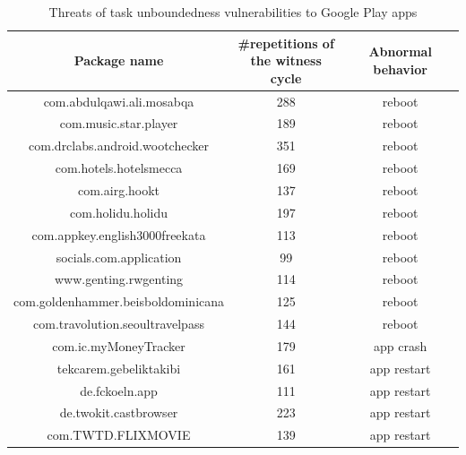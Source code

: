 \begin{table}[htbp]
\begin{center}
	\begin{tabular}{|c|c|c|}   
		\hline   
	\textbf{Package name} & \shortstack{\#repetitions of \\ the witness cycle} & \textbf{Abnormal behavior} \\ 
	\hline  		
	\hline   com.abdulqawi.ali.mosabqa & 288 & reboot  \\ 
	\hline    com.music.star.player & 189 & reboot  \\ 
	\hline  com.drclabs.android.wootchecker & 351 & reboot  \\ 
	\hline    com.hotels.hotelsmecca & 169 & reboot  \\ 
	\hline    com.airg.hookt & 137 & reboot  \\ 
	\hline    com.holidu.holidu & 197 & reboot  \\ 
	\hline   com.appkey.english3000freekata & 113 & reboot  \\ 
	\hline   socials.com.application & 99 & reboot  \\ 
	\hline  www.genting.rwgenting & 114 & reboot  \\ 
	\hline    com.goldenhammer.beisboldominicana & 125 & reboot  \\ 
	\hline    com.travolution.seoultravelpass & 144 & reboot  \\ 
	\hline   com.ic.myMoneyTracker & 179 & app crash  \\ 
	\hline    tekcarem.gebeliktakibi & 161 & app restart  \\ 
	\hline    de.fckoeln.app & 111 & app restart  \\ 
	\hline    de.twokit.castbrowser & 223 & app restart  \\ 
	\hline   com.TWTD.FLIXMOVIE & 139 & app restart  \\ 
	\hline
	\end{tabular}
	\caption{Threats of task unboundedness vulnerabilities to Google Play apps }
	 \label{tab:threat-gg-task}
\end{center}
	\end{table}

